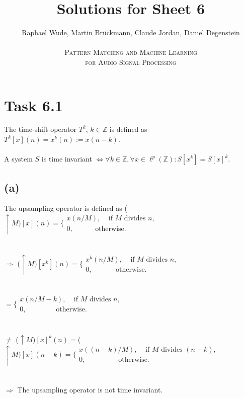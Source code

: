\documentclass[12pt]{article}
\begin{document}
\title{Solutions for Sheet 6}
\author{Raphael Wude, Martin Brückmann, Claude Jordan, Daniel Degenstein\\ \\
\textsc{Pattern Matching and Machine Learning} \\
\textsc{for Audio Signal Processing}}
\maketitle

\section*{Task 6.1}
The time-shift operator $T^{k}$, $k \in \mathbb{Z}$ is defined as $T^{k}[x](n) = x^{k}(n) := x(n-k)$.\\\\
A system $S$ is time invariant $\Leftrightarrow \forall k \in \mathbb{Z}, \forall x \in \ell^{p}(\mathbb{Z}): S[x^{k}]=S[x]^{k}$.

\subsection*{(a)}
The upsampling operator is defined as (${\uparrow}M)[x](n)=\Bigg\{\begin{array}{l} x(n/M), ~~~~~\text{if } M \text{ divides } n\text{,}\\ 0, ~~~~~~~~~~~~~~\text{otherwise.} \end{array}$\\\\\\
$\Rightarrow$ (${\uparrow}M)[x^{k}](n)=\Bigg\{\begin{array}{l} x^{k}(n/M), ~~~~~\text{if } M \text{ divides } n\text{,}\\ 0, ~~~~~~~~~~~~~~~\text{otherwise.} \end{array}$\\\\\\
$=\Bigg\{\begin{array}{l} x(n/M -k), ~~~~~\text{if } M \text{ divides } n\text{,}\\ 0, ~~~~~~~~~~~~~~~~~~~\text{otherwise.} \end{array}$\\\\\\
$\neq$ (${\uparrow}M)[x]^{k}(n)=$(${\uparrow}M)[x](n-k)=\Bigg\{\begin{array}{l} x((n-k)/M), ~~~~~\text{if } M \text{ divides } (n-k)\text{,}\\ 0, ~~~~~~~~~~~~~~~~~~~~~\text{otherwise.} \end{array}$\\\\\\
$\Rightarrow$ The upsampling operator is not time invariant.
\newpage
\end{document}
